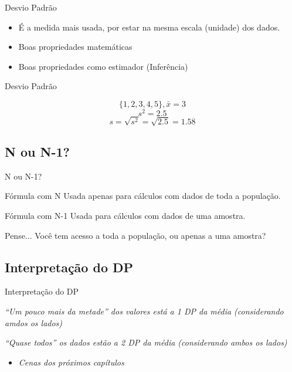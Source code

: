 \documentclass{beamer}
\begin{document}
\begin{frame}{Desvio Padrão}
  \begin{itemize}
  \item É a medida mais usada, por estar na mesma escala (unidade) dos
    dados.
  \item Boas propriedades matemáticas
  \item Boas propriedades como estimador (Inferência)
  \end{itemize}
\end{frame}

\begin{frame}{Desvio Padrão}
  \begin{example}
      \begin{displaymath}
    \{1,2,3,4,5\}, \bar{x} = 3
  \end{displaymath}
      \begin{displaymath}
        s^2 = 2.5
      \end{displaymath}
    \begin{displaymath}
        s = \sqrt{s^2} = \sqrt{2.5} = 1.58
    \end{displaymath}
  \end{example}
\end{frame}

\subsection{N ou N-1?}

\begin{frame}{N ou N-1?}
  \begin{block}{Fórmula com N}
    Usada apenas para cálculos com dados de toda a população.
  \end{block}
  \begin{block}{Fórmula com N-1}
    Usada para cálculos com dados de uma amostra.
  \end{block}
  \begin{block}{Pense...}
      Você tem acesso a toda a população, ou apenas a uma amostra?
  \end{block}
\end{frame}

\subsection{Interpretação do DP}

\begin{frame}{Interpretação do DP}
  \begin{block}{}
    {\em ``Um pouco mais da metade'' dos valores está a 1 DP da média (considerando amdos os lados)}
  \end{block}
  \begin{block}{}
    {\em ``Quase todos'' os dados estão a 2 DP da média (considerando ambos os lados)}
  \end{block}
  \begin{itemize}
  \item {\em Cenas dos próximos capítulos}
  \end{itemize}
\end{frame}
\end{document}
